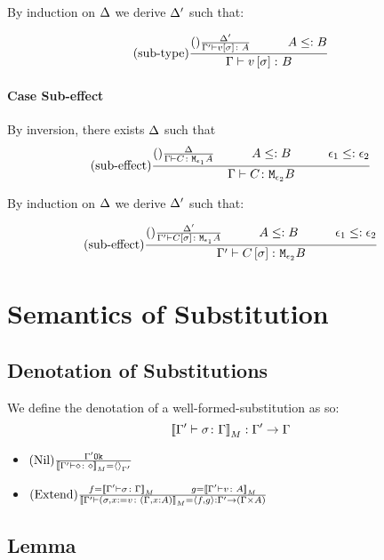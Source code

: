 {        By induction on $\Delta$ we derive $\Delta'$ such that:

        \begin{equation}
            \treerule{sub-type}{\treerule{}{\D'}{\typerelation{\G'}{v\ssi}{A}}\s\s A\subtype B}{\typerelation{\G}{v\ssi}{B}}
        \end{equation}
    \paragraph{Case Sub-effect}
    By inversion, there exists $\Delta$ such that
    \begin{equation}
        \treerule{sub-effect}{\treerule{}{\D}{\typerelation{\G}{C}{\M{\e_1}{A}}}\s\s A\subtype B\s\s\e_1\subtype\e_2}{\typerelation{\G}{C}{\M{\e_2}{B}}}
    \end{equation}

    By induction on $\Delta$ we derive $\Delta'$ such that:

    \begin{equation}
        \treerule{sub-effect}{\treerule{}{\D'}{\typerelation{\G'}{C\ssi}{\M{\e_1}{A}}}\s\s A\subtype B\s\s\e_1\subtype\e_2}{\typerelation{\G'}{C\ssi}{\M{\e_2}{B}}}
    \end{equation}
    \section{Semantics of Substitution}
    \subsection{Denotation of Substitutions}
    We define the denotation of a well-formed-substitution as so:
    \begin{equation}
        {\bf [\![}\Gamma' \vdash \sigma \colon \Gamma{\bf ]\!]}_M: \Gamma' \rightarrow \Gamma
    \end{equation}
    \begin{itemize}
        \item $(\text{Nil}) \frac{\Gamma' \texttt{Ok}}{{\bf [\![}\Gamma' \vdash \diamond \colon \diamond{\bf ]\!]}_M = \left\langle\right\rangle_{\Gamma'}}$
        \item $\treerule{Extend}{f = \deno{\typerelation{\G'}{\si}{\G}}\s\s g= \deno{\typerelation{\G'}{v}{A}}}{\deno{\typerelation{\G'}{(\si, x\setto v}{(\gax)}} = \pr{f}{g}:\G' \rightarrow (\G\times A)}$
    \end{itemize}
    \subsection{Lemma}
}
